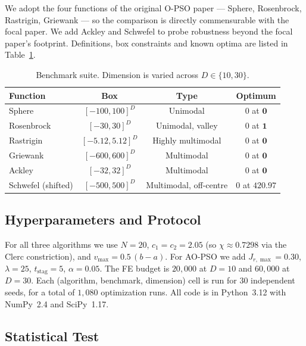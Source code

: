\documentclass[11pt,a4paper]{article}
\newcommand{\algoname}{AO-PSO}
\newcommand{\opso}{O-PSO}
\newcommand{\jrmax}{J_{r,\max}}
\begin{document}
We adopt the four functions of the original \opso{}
paper --- Sphere, Rosenbrock, Rastrigin, Griewank --- so the comparison is
directly commensurable with the focal paper. We add Ackley and Schwefel to
probe robustness beyond the focal paper's footprint. Definitions, box
constraints and known optima are listed in Table~\ref{tab:benchmarks}.

\begin{table}[H]
\centering
\renewcommand{\arraystretch}{1.2}
\begin{tabular}{l c c c}
\toprule
\textbf{Function}    & \textbf{Box}       & \textbf{Type}      & \textbf{Optimum}\\
\midrule
Sphere               & $[-100, 100]^D$    & Unimodal           & $0$ at $\mathbf{0}$       \\
Rosenbrock           & $[-30, 30]^D$      & Unimodal, valley   & $0$ at $\mathbf{1}$       \\
Rastrigin            & $[-5.12, 5.12]^D$  & Highly multimodal  & $0$ at $\mathbf{0}$       \\
Griewank             & $[-600, 600]^D$    & Multimodal         & $0$ at $\mathbf{0}$       \\
Ackley               & $[-32, 32]^D$      & Multimodal         & $0$ at $\mathbf{0}$       \\
Schwefel (shifted)   & $[-500, 500]^D$    & Multimodal, off-centre & $0$ at $\mathbf{420.97}$\\
\bottomrule
\end{tabular}
\caption{Benchmark suite. Dimension is varied across $D \in \{10, 30\}$.}
\label{tab:benchmarks}
\end{table}

\subsection{Hyperparameters and Protocol}

For all three algorithms we use $N = 20$, $c_1 = c_2 = 2.05$ (so $\chi
\approx 0.7298$ via the Clerc constriction), and $v_{\max} = 0.5\,(b-a)$.
For \algoname{} we add $\jrmax = 0.30$, $\lambda = 25$, $t_{\text{stag}} =
5$, $\alpha = 0.05$. The FE budget is $20{,}000$ at $D = 10$ and $60{,}000$
at $D = 30$. Each (algorithm, benchmark, dimension) cell is run for $30$
independent seeds, for a total of $1{,}080$ optimization runs. All code is
in Python~3.12 with NumPy~2.4 and SciPy~1.17.

\subsection{Statistical Test}
\end{document}
